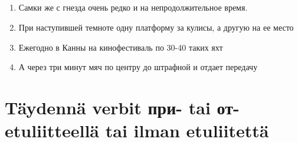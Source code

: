\documentclass[paper=a4, fontsize=11pt]{scrartcl}
\begin{document}
\subsection{}

\begin{enumerate}
    \item Самки же  с гнезда очень редко и на непродолжительное время. 
    \item При наступившей темноте одну платформу  за кулисы, а другую на ее место 
    \item Ежегодно в Канны на кинофестиваль  по 30-40 таких яхт
    \item А через три минут  мяч по центру до штрафной и отдает передачу
\end{enumerate}


\section{Täydennä verbit при- tai от-etuliitteellä tai ilman etuliitettä}
\end{document}
